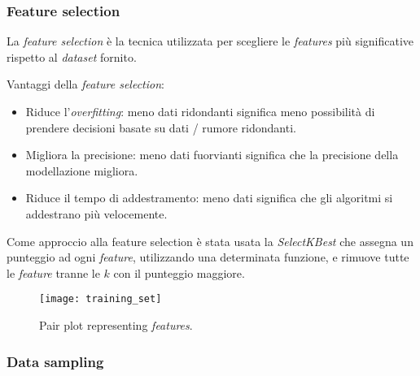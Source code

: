                 
                \subsubsection{Feature selection}
                
		                La \textit{feature selection} è la tecnica utilizzata per scegliere le \textit{features} più significative rispetto al \textit{dataset} fornito.
		                
		                Vantaggi della \textit{feature selection}:
		                
		                \begin{itemize}
		                	\item Riduce l'\textit{overfitting}: meno dati ridondanti significa meno possibilità di prendere decisioni basate su dati / rumore ridondanti.
		                	\item Migliora la precisione: meno dati fuorvianti significa che la precisione della modellazione migliora.
		                	\item Riduce il tempo di addestramento: meno dati significa che gli algoritmi si addestrano più velocemente.	              
		                \end{itemize}
		                
                        Come approccio alla feature selection è stata usata la \textit{SelectKBest} che assegna un punteggio ad ogni \textit{feature}, utilizzando una determinata funzione, e rimuove tutte le \textit{feature} tranne le $k$ con il punteggio maggiore.
                        \bigbreak
                        
                     
                        
                        \begin{figure}[!h]
                            \centering
                            \texttt{[image: training\_set]}
                            \caption{Pair plot representing \textit{features}.}
                            \label{fig:training_set_pairplot}
                        \end{figure}
                        \clearpage
                
                \subsubsection{Data sampling} 
                
